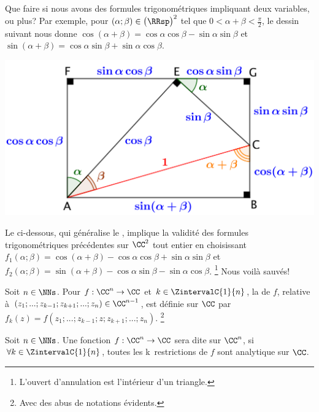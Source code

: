 Que faire si nous avons des formules trigonométriques impliquant deux variables, ou plus?
Par exemple,
pour
$(\alpha ; \beta) \in \big( \RRsp \big)^2$ tel que $0 < \alpha + \beta < \frac{\pi}{2}$,
le dessin suivant nous donne
$\cos(\alpha + \beta) = \cos \alpha \cos \beta - \sin \alpha \sin \beta$
et
$\sin(\alpha + \beta) = \cos \alpha \sin \beta + \sin \alpha \cos \beta$.%

\begin{center}
	\includegraphics[scale=.7]{add-trigo-formulas.png}
\end{center}

Le  ci-dessous, qui généralise le , implique la validité des formules trigonométriques précédentes sur $\CC^2$ tout entier en choisissant
$f_1(\alpha ; \beta) = \cos(\alpha + \beta) - \cos \alpha \cos \beta + \sin \alpha \sin \beta$
et
$f_2(\alpha ; \beta) = \sin(\alpha + \beta) - \cos \alpha \sin \beta - \sin \alpha \cos \beta$.%
\footnote{
    L'ouvert d'annulation est l'intérieur d'un triangle.
}
Nous voilà sauvés!




\begin{defi}
    Soit $n \in \NNs$.
    Pour $f: \CC^n \rightarrow \CC$
    et
    $k \in \ZintervalC{1}{n}$,
    la  de $f$, relative à $(z_1 ; ... ; z_{k-1} ; z_{k+1} ; ... ; z_n) \in \CC^{n-1}$, est définie sur $\CC$ par
    $f_k(z) = f(z_1 ; ... ; z_{k-1} ; z ; z_{k+1} ; ... ; z_n)$.%
	\footnote{
		Avec des abus de notations évidents.
	}
\end{defi}


\begin{defi}
    Soit $n \in \NNs$.
    Une fonction $f: \CC^n \rightarrow \CC$ sera dite  sur $\CC^n$,
    si $\forall k \in \ZintervalC{1}{n}$,
    toutes les k\iemes\ restrictions de $f$ sont analytique sur $\CC$.
\end{defi}


